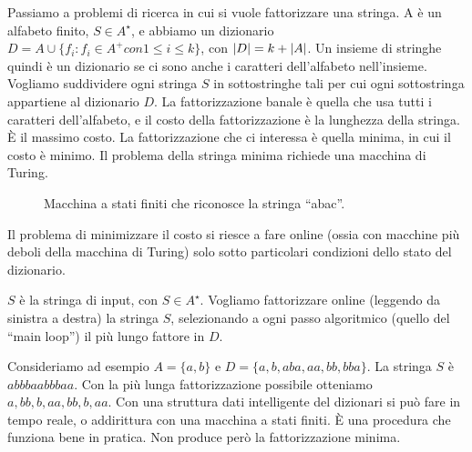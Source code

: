Passiamo a problemi di ricerca in cui si vuole fattorizzare una stringa. A \`e un alfabeto finito, $S \in A^{\star}$, e abbiamo un dizionario $D = A \cup \{ f_i : f_i \in A^{+} con 1 \le i \le k \}$, con $\left\lvert{D}\right\rvert = k + \left\lvert{A}\right\rvert$. Un insieme di stringhe quindi \`e un dizionario se ci sono anche i caratteri dell'alfabeto nell'insieme. Vogliamo suddividere ogni stringa $S$ in sottostringhe tali per cui ogni sottostringa appartiene al dizionario $D$. La fattorizzazione banale \`e quella che usa tutti i caratteri dell'alfabeto, e il costo della fattorizzazione \`e la lunghezza della stringa. \`E il massimo costo. La fattorizzazione che ci interessa \`e quella minima, in cui il costo \`e minimo. Il problema della stringa minima richiede una macchina di Turing.

\begin{figure}
\centering
{}
\caption{Macchina a stati finiti che riconosce la stringa ``abac''.}
\end{figure}

Il problema di minimizzare il costo si riesce a fare online (ossia con macchine pi\`u deboli della macchina di Turing) solo sotto particolari condizioni dello stato del dizionario.

$S$ \`e la stringa di input, con $S \in A^{\star}$. Vogliamo fattorizzare online (leggendo da sinistra a destra) la stringa $S$, selezionando a ogni passo algoritmico (quello del ``main loop'') il pi\`u lungo fattore in $D$.

Consideriamo ad esempio $A = \{ a,b \}$ e $D = \{ a, b, aba, aa, bb, bba \}$. La stringa $S$ \`e $abbbaabbbaa$. Con la pi\`u lunga fattorizzazione possibile otteniamo $a,bb,b,aa,bb,b,aa$. Con una struttura dati intelligente del dizionari si pu\`o fare in tempo reale, o addirittura con una macchina a stati finiti. \`E una procedura che funziona bene in pratica. Non produce per\`o la fattorizzazione minima.

